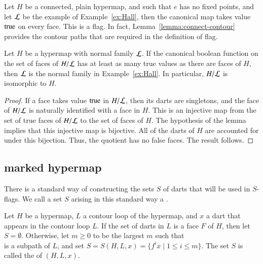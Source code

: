 \begin{example} Let $H$ be a connected, plain hypermap, and such that
$e$ has no fixed points, and let $\cal L$ be the example of
Example~\ref{ex:Hall}, then the canonical map takes value
${\operatorname{true}}$ on every face.  This is a flag. In fact,
Lemma~\ref{lemma:connect-contour} provides the contour paths that
are required in the definition of flag.
\end{example}

\begin{lemma}  
Let $H$ be a hypermap with normal family ${\cal L}$. If the
canonical boolean function on the set of faces of $H/{\cal L}$ has
at least as many true values as there are faces of $H$, then $\cal
L$ is the normal family in Example~\ref{ex:Hall}. In particular,
$H/{\cal L}$ is isomorphic to $H$.
\end{lemma}

\begin{proof} If a face takes value ${\operatorname{true}}$ in $H/{\cal L}$, then
its darts are singletons, and the face of $H/{\cal L}$ is naturally
identified with a face in $H$.  This is an injective map from the
set of true faces of $H/{\cal L}$ to the set of faces of $H$.  The
hypothesis of the lemma implies that this injective map is
bijective. All of the darts of $H$ are accounted for under this
bijection. Thus, the quotient has no false faces.  The result
follows.
\end{proof}


\subsection{marked hypermap}\label{sec:face-insert}
%



There is a standard way of constructing the sets $S$ of darts that
will be used in $S$-flags.  We call a set $S$ arising in this
standard way a .

\begin{definition}
Let $H$ be a hypermap, $L$ a contour loop of the hypermap,
and $x$ a dart that appears in the contour loop $L$.
If the set of darts in $L$ is a face $F$ of $H$, then let $S=\emptyset$.
Otherwise,
let $m\ge0$ to be the largest $m$ 
such that 
\begin{displaymath}
[x;f x; f^2 x;\ldots;f^{m+1} x]
\end{displaymath}  
is a subpath of $L$, and
set $S = S(H,L,x) = \{f^i x \mid 1 \le i\le m\}$.
The set $S$ is called the  of $(H,L,x)$.
\end{definition}

